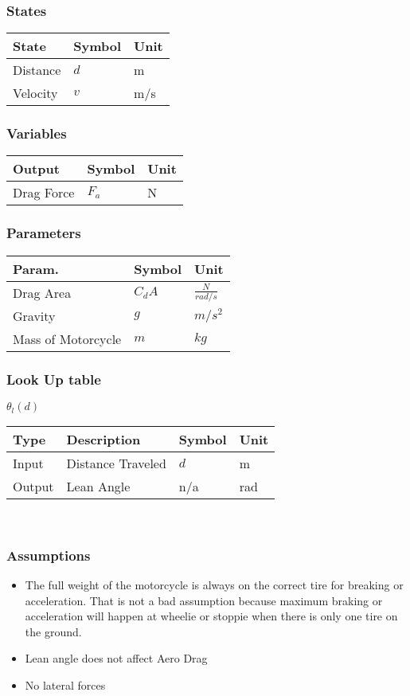 \documentclass[../SimBALink.tex]{subfiles}
\begin{document}
\subsubsection{States}
	\begin{tabular}{ l | l | l  }
		State					&	Symbol		&	Unit		\\	\hline
		Distance				&	$d$			& 	m \\
		Velocity 				&	$v$			&	m/s \\
	\end{tabular}
\subsubsection{Variables}
	\begin{tabular}{ l | l | l  }
		Output					&	Symbol		&	Unit		\\	\hline
		Drag Force				&	$F_a$		&  N
						
	\end{tabular}
\subsubsection{Parameters}
	\begin{tabular}{ l | l | l  }
		Param.					&	Symbol		&	Unit		\\	\hline
		Drag Area				&	$C_dA$		&	 $\frac{N}{rad/s}$ \\		
		Gravity 				&	$g$			&	$m/s^2$ \\
		Mass of Motorcycle		&	$m$			&  $kg$				
	\end{tabular}
\subsubsection{Look Up table}
$\theta_l(d)$ \\
	\begin{tabular}{ l | l | l | l }
		Type				& Description		&	Symbol		&	Unit		\\	\hline
		Input 				& Distance Traveled	&	$d$  		& 	m		\\
		Output 				& Lean Angle		&	n/a			&	rad
	\end{tabular} \\

\subsubsection{Assumptions}
\begin{itemize}
    \item The full weight of the motorcycle is always on the correct tire for breaking or acceleration. That is not a bad assumption because maximum braking or acceleration will happen at wheelie or stoppie when there is only one tire on the ground.
    \item Lean angle does not affect Aero Drag
    \item No lateral forces
\end{itemize}
\end{document}
